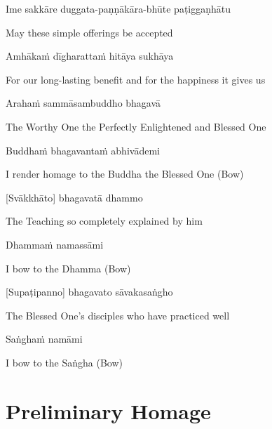 Ime sakkāre duggata-paṇṇākāra-bhūte paṭiggaṇhātu

\begin{cprenglish}
  May these simple offerings be accepted
\end{cprenglish}

Amhākaṁ dīgharattaṁ hitāya sukhāya

\begin{cprenglish}
  For our long-lasting benefit and for the happiness it gives us
\end{cprenglish}

Arahaṁ sammāsambuddho bhagavā

\begin{cprenglish}
  The Worthy One the Perfectly Enlightened and Blessed One
\end{cprenglish}

Buddhaṁ bhagavantaṁ abhivādemi\relax

\begin{cprenglish}
  I render homage to the Buddha the Blessed One (Bow)
\end{cprenglish}

[Svākkhāto] bhagavatā dhammo

\begin{cprenglish}
  The Teaching so completely explained by him
\end{cprenglish}

Dhammaṁ namassāmi\relax

\begin{cprenglish}
  I bow to the Dhamma (Bow)
\end{cprenglish}

[Supaṭipanno] bhagavato sāvakasaṅgho

\begin{cprenglish}
  The Blessed One’s disciples who have practiced well
\end{cprenglish}

Saṅghaṁ namāmi

\begin{cprenglish}
  I bow to the Saṅgha (Bow)
\end{cprenglish}

\section{Preliminary Homage}

\begin{leader}
\end{leader}
\begin{leader}
\end{leader}

